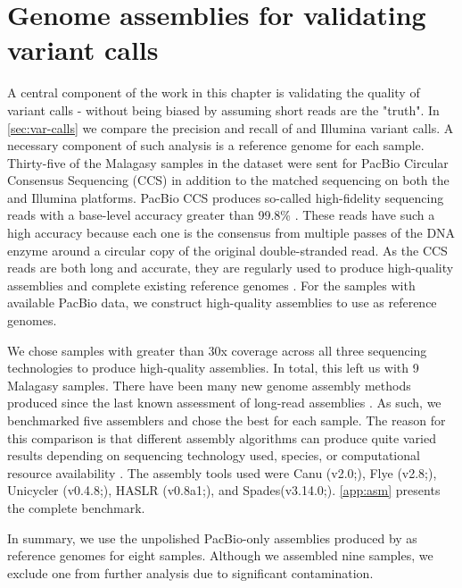 \section{Genome assemblies for validating variant calls}
\label{sec:asm_results}
A central component of the work in this chapter is validating the quality of variant calls - without being biased by assuming short reads are the "truth". In \autoref{sec:var-calls} we compare the precision and recall of \ont{} and Illumina variant calls. A necessary component of such analysis is a reference genome for each sample. Thirty-five of the Malagasy samples in the dataset were sent for PacBio Circular Consensus Sequencing (CCS) in addition to the matched sequencing on both the \ont{} and Illumina platforms. PacBio CCS produces so-called high-fidelity sequencing reads with a base-level accuracy greater than 99.8\% \cite{wenger2019}. These reads have such a high accuracy because each one is the consensus from multiple passes of the DNA enzyme around a circular copy of the original double-stranded read. As the CCS reads are both long and accurate, they are regularly used to produce high-quality \denovo{} assemblies and complete existing reference genomes \cite{garg2021,masonbrink2021}. For the samples with available PacBio data, we construct high-quality assemblies to use as reference genomes.

We chose samples with greater than 30x coverage across all three sequencing technologies to produce high-quality assemblies. In total, this left us with 9 Malagasy samples. There have been many new genome assembly methods produced since the last known assessment of \mtb{} long-read assemblies \cite{bainomugisa2018}. As such, we benchmarked five assemblers and chose the best for each sample. The reason for this comparison is that different assembly algorithms can produce quite varied results depending on sequencing technology used, species, or computational resource availability \cite{wick2020,demaio2019}. The assembly tools used were Canu (v2.0;\cite{koren2017,nurk2020}), Flye (v2.8;\cite{flye2019}), Unicycler (v0.4.8;\cite{wick2017}), HASLR (v0.8a1;\cite{haslr2020}), and Spades(v3.14.0;\cite{antipov2016}). \autoref{app:asm} presents the complete benchmark.

In summary, we use the unpolished PacBio-only assemblies produced by \flye{} as reference genomes for eight samples. Although we assembled nine samples, we exclude one from further analysis due to significant contamination.


